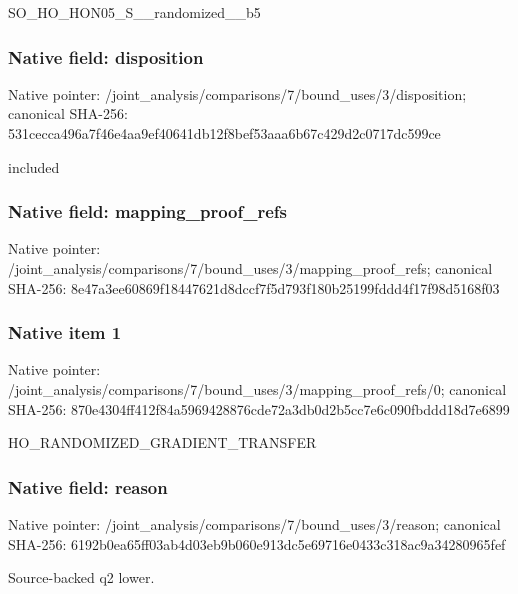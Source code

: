 \documentclass[10pt,a4paper]{article}
\begin{document}
\begingroup\raggedright\sloppy SO\_\allowbreak{}HO\_\allowbreak{}HON05\_\allowbreak{}S\_\allowbreak{}\_\allowbreak{}randomized\_\allowbreak{}\_\allowbreak{}b5\par\endgroup

\subsubsection{Native field: disposition}
Native pointer: /joint\_\allowbreak{}analysis/comparisons/7/bound\_\allowbreak{}uses/3/disposition; canonical SHA-256: 531cecca496a7f46e4aa9ef40641db12f8bef53aaa6b67c429d2c0717dc599ce

\begingroup\raggedright\sloppy included\par\endgroup

\subsubsection{Native field: mapping\_\allowbreak{}proof\_\allowbreak{}refs}
Native pointer: /joint\_\allowbreak{}analysis/comparisons/7/bound\_\allowbreak{}uses/3/mapping\_\allowbreak{}proof\_\allowbreak{}refs; canonical SHA-256: 8e47a3ee60869f18447621d8dccf7f5d793f180b25199fddd4f17f98d5168f03

\subsubsection{Native item 1}
Native pointer: /joint\_\allowbreak{}analysis/comparisons/7/bound\_\allowbreak{}uses/3/mapping\_\allowbreak{}proof\_\allowbreak{}refs/0; canonical SHA-256: 870e4304ff412f84a5969428876cde72a3db0d2b5cc7e6c090fbddd18d7e6899

\begingroup\raggedright\sloppy HO\_\allowbreak{}RANDOMIZED\_\allowbreak{}GRADIENT\_\allowbreak{}TRANSFER\par\endgroup

\subsubsection{Native field: reason}
Native pointer: /joint\_\allowbreak{}analysis/comparisons/7/bound\_\allowbreak{}uses/3/reason; canonical SHA-256: 6192b0ea65ff03ab4d03eb9b060e913dc5e69716e0433c318ac9a34280965fef

\begingroup\raggedright\sloppy Source-backed q2 lower.\par\endgroup
\end{document}
